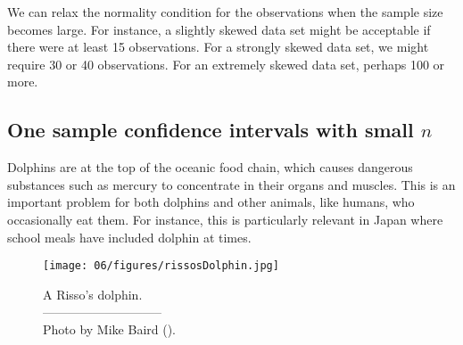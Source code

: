 We can relax the normality condition for the observations when the sample size becomes large. For instance, a slightly skewed data set might be acceptable if there were at least 15 observations. For a strongly skewed data set, we might require 30 or 40 observations. For an extremely skewed data set, perhaps 100 or more.

\subsection{One sample confidence intervals with small $n$}

Dolphins are at the top of the oceanic food chain, which causes dangerous substances such as mercury to concentrate in their organs and muscles. This is an important problem for both dolphins and other animals, like humans, who occasionally eat them. For instance, this is particularly relevant in Japan where school meals have included dolphin at times.
\setlength{\captionwidth}{71.5mm}
\begin{figure}[h]
\centering
\texttt{[image: 06/figures/rissosDolphin.jpg]}  \\
\addvspace{2mm}
\begin{minipage}{\textwidth}
   \caption[rissosDolphinPic]{A Risso's dolphin.\vspace{-1mm} \\
   -----------------------------\vspace{-2mm}\\
   {\footnotesize Photo by Mike Baird ().%
}\vspace{-8mm}}
   \label{rissosDolphin}
\end{minipage}
\vspace{3mm}
\end{figure}
\setlength{\captionwidth}{\mycaptionwidth}

